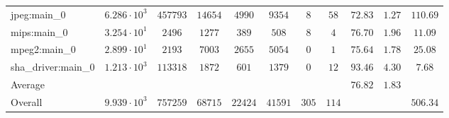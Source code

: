 \begin{tabular}{|l|c|c|c|c|c|c|c|c|c|c|}
jpeg:main\_0            & $ 6.286 \cdot 10^{3} $ & $ 457793 $ & $ 14654 $ & $ 4990  $ & $ 9354  $ & $ 8   $ & $ 58  $ & $ 72.83       $ & $ 1.27    $ & $ 110.69  $ \\
mips:main\_0            & $ 3.254 \cdot 10^{1} $ & $ 2496   $ & $ 1277  $ & $ 389   $ & $ 508   $ & $ 8   $ & $ 4   $ & $ 76.70       $ & $ 1.96    $ & $ 11.09   $ \\
mpeg2:main\_0           & $ 2.899 \cdot 10^{1} $ & $ 2193   $ & $ 7003  $ & $ 2655  $ & $ 5054  $ & $ 0   $ & $ 1   $ & $ 75.64       $ & $ 1.78    $ & $ 25.08   $ \\
sha\_driver:main\_0     & $ 1.213 \cdot 10^{3} $ & $ 113318 $ & $ 1872  $ & $ 601   $ & $ 1379  $ & $ 0   $ & $ 12  $ & $ 93.46       $ & $ 4.30    $ & $ 7.68    $ \\
\hline
Average                 & $                    $ & $        $ & $       $ & $       $ & $       $ & $     $ & $     $ & $ 76.82       $ & $ 1.83    $ & $         $ \\
\hline
Overall                 & $ 9.939 \cdot 10^{3} $ & $ 757259 $ & $ 68715 $ & $ 22424 $ & $ 41591 $ & $ 305 $ & $ 114 $ & $             $ & $         $ & $ 506.34  $ \\
\hline
\end{tabular}
